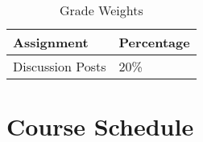 \documentclass[12pt, letterpaper]{article}
\begin{document}
\begin{table}[ht]
    \centering
    \caption{Grade Weights}
    \begin{tabular}{ll}
        \toprule
    \textbf{Assignment} & \textbf{Percentage} \\
    \midrule
    Discussion Posts & 20\% \\
    \bottomrule
    \end{tabular}
    \label{tab:grade-weights}
    \end{table}

\section*{Course Schedule}
\end{document}
